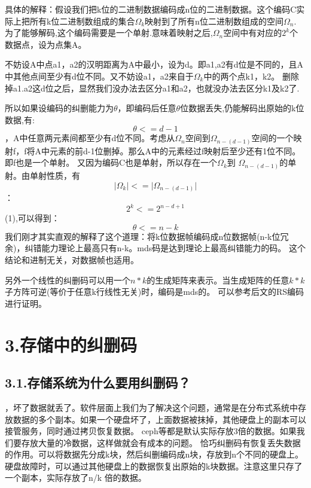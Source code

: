 \documentclass{article}
\begin{document}
具体的解释：假设我们把k位的二进制数据编码成n位的二进制数据。这个编码C实际上把所有k位二进制数组成的集合$\Omega_k$映射到了所有n位二进制数组成的空间$\Omega_n$.
为了能够解码,这个编码需要是一个单射.意味着映射之后,$\Omega_n$空间中有对应的$2^k$个数据点，设为点集A。%

不妨设A中点a1，a2的汉明距离为A中最小，设为d。即a1,a2有d位是不同的，且A中其他点间至少有d位不同。又不妨设a1，a2来自于$\Omega_k$中的两个点k1，k2。
删除掉a1.a2这d位之后，显然我们没办法去区分a1和a2，也就没办法去区分k1及k2了.%

所以如果设编码的纠删能力为$\theta$，即编码后任意$\theta$位数据丢失,仍能解码出原始的k位数据,有:%
\label{}%
\noindent{}
\noindent\[\theta <= d - 1
\]%
，A中任意两元素间都至少有d位不同。考虑从$\Omega_n$空间到$\Omega_{n-(d-1)}$空间的一个映射f，f将A中元素的前d-1位删掉。那么A中的元素经过f映射后至少还有1位不同。即f也是一个单射。
又因为编码C也是单射，所以存在一个$\Omega_k$到 $\Omega_{n-(d-1)}$的单射。由单射性质，有
\label{}%
\noindent{}
\noindent\[\lvert \Omega_k \rvert <= \lvert \Omega_{n-(d-1)} \rvert
\]%
：
\label{}%
\noindent{}
\noindent\[2^k <= 2^{n-d+1}
\]%
(1),可以得到：
\label{}%
\noindent{}
\noindent\[\theta <= n - k 
\]%
\noindent{} 
我们刚才其实直观的解释了这个道理：将k位数据帧编码成n位数据帧(n-k位冗余)，纠错能力理论上最高只有n-k。mds码是达到理论上最高纠错能力的码。
这个结论和进制无关，对数据帧也适用。

另外一个线性的纠删码可以用一个$n*k$的生成矩阵来表示。当生成矩阵的任意$k*k$子方阵可逆(等价于任意k行线性无关)时，编码是mds的。
可以参考后文的RS编码进行证明。%

\section{3.\hspace*{0.5em}存储中的纠删码}\label{section}%

\subsection{3.1.\hspace*{0.5em}存储系统为什么要用纠删码？}\label{section}%

，坏了数据就丢了。软件层面上我们为了解决这个问题，通常是在分布式系统中存放数据的多个副本。如果一个硬盘坏了，上面数据被抹掉，其他硬盘上的副本可以接管服务，同时通过拷贝恢复数据。
ceph等都是默认实际存放3倍的数据。如果我们要存放大量的冷数据，这样做就会有成本的问题。
恰巧纠删码有恢复丢失数据的作用。可以将数据先分成k块，然后纠删编码成n块，存放到n个不同的硬盘上。
硬盘故障时，可以通过其他硬盘上的数据恢复出原始的k块数据。注意这里只存了一个副本，实际存放了n/k 倍的数据。%
\end{document}
